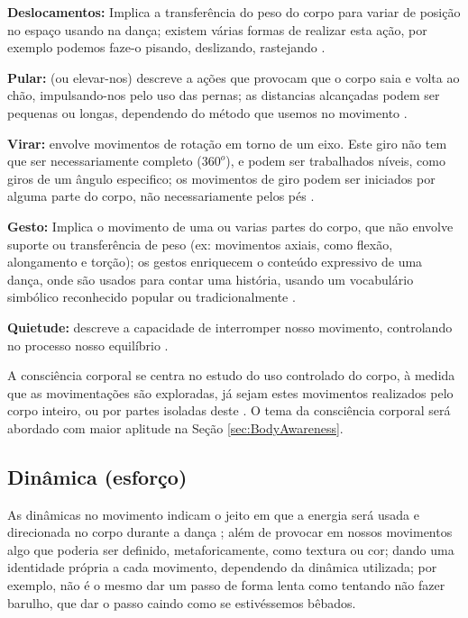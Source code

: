 \textbf{Deslocamentos:} Implica a transferência do peso do corpo 
para variar de posição no espaço usando na dança;
existem várias formas de realizar esta ação,
por exemplo podemos faze-o pisando, deslizando, rastejando \cite[pp. 28]{paine2014complete}.

\textbf{Pular:} (ou elevar-nos) descreve a ações que provocam que o corpo saia e volta ao chão,
impulsando-nos pelo uso das pernas; as distancias alcançadas podem ser pequenas ou longas,
dependendo do método que usemos no movimento  \cite[pp. 28]{paine2014complete}. 

\textbf{Virar:} envolve movimentos de rotação em torno de um eixo.
Este giro não tem que ser necessariamente completo ($360^o$),
e podem ser trabalhados níveis, como giros de um ângulo especifico;
os movimentos de giro podem ser iniciados por alguma parte do corpo, 
não necessariamente pelos pés \cite[pp. 29]{paine2014complete}.

\textbf{Gesto:} Implica o movimento de uma ou varias partes do corpo,
que não envolve suporte ou transferência de peso
(ex: movimentos axiais, como flexão, alongamento e torção);
os gestos enriquecem o conteúdo expressivo de uma dança,
onde são usados para contar uma história, 
usando um vocabulário simbólico reconhecido popular ou tradicionalmente 
\cite[pp. 29]{paine2014complete}.

\textbf{Quietude:} descreve a capacidade de interromper nosso movimento, 
controlando no processo nosso equilíbrio \cite[pp. 29]{paine2014complete}.


A consciência corporal se centra no estudo do uso controlado do corpo, 
à medida que as movimentações são exploradas,
já sejam  estes movimentos realizados pelo corpo inteiro,
ou por partes isoladas deste \cite[pp. 5]{carline2011lesson}.
O tema da consciência corporal será abordado com maior aplitude  na Seção \ref{sec:BodyAwareness}.


\subsection{Dinâmica (esforço)}
As dinâmicas no movimento 
indicam o jeito em que a energia será usada e direcionada no corpo durante a dança \cite[pp. 131, 136]{mccutchen2006teaching};
além de provocar em nossos movimentos algo que poderia ser definido, metaforicamente, como textura ou cor;
dando uma identidade própria a cada movimento, dependendo da dinâmica utilizada;
por exemplo, não é o mesmo dar um passo de forma lenta como tentando não fazer barulho,
que dar o passo caindo como se estivéssemos bêbados.

